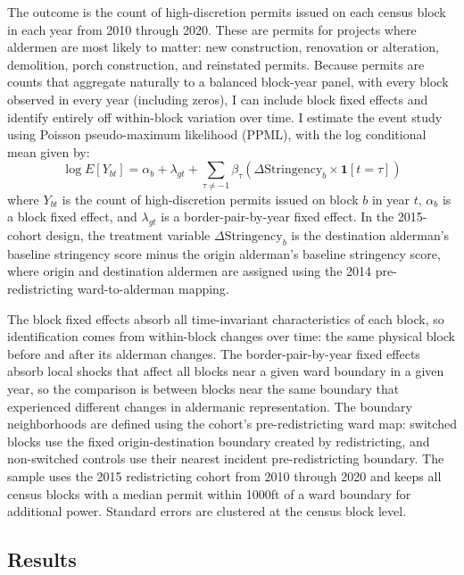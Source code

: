 The outcome is the count of high-discretion permits issued on each census block in each year from 2010 through 2020.
These are permits for projects where aldermen are most likely to matter: new construction, renovation or alteration, demolition, porch construction, and reinstated permits.
Because permits are counts that aggregate naturally to a balanced block-year panel, with every block observed in every year (including zeros), I can include block fixed effects and identify entirely off within-block variation over time.
I estimate the event study using Poisson pseudo-maximum likelihood (PPML), with the log conditional mean given by:
%
\begin{equation}
\label{eq:event_study_permits}
\log E[Y_{bt}] = \alpha_b + \lambda_{gt} + \sum_{\tau \neq -1} \beta_\tau \left( \Delta\text{Stringency}_b \times \mathbf{1}[t = \tau] \right)
\end{equation}
%
where $Y_{bt}$ is the count of high-discretion permits issued on block $b$ in year $t$, $\alpha_b$ is a block fixed effect, and $\lambda_{gt}$ is a border-pair-by-year fixed effect.
In the 2015-cohort design, the treatment variable $\Delta\text{Stringency}_b$ is the destination alderman's baseline stringency score minus the origin alderman's baseline stringency score, where origin and destination aldermen are assigned using the 2014 pre-redistricting ward-to-alderman mapping.

The block fixed effects absorb all time-invariant characteristics of each block, so identification comes from within-block changes over time: the same physical block before and after its alderman changes.
The border-pair-by-year fixed effects absorb local shocks that affect all blocks near a given ward boundary in a given year, so the comparison is between blocks near the same boundary that experienced different changes in aldermanic representation.
The boundary neighborhoods are defined using the cohort's pre-redistricting ward map: switched blocks use the fixed origin-destination boundary created by redistricting, and non-switched controls use their nearest incident pre-redistricting boundary.
The sample uses the 2015 redistricting cohort from 2010 through 2020 and keeps all census blocks with a median permit within 1000ft of a ward boundary for additional power.
Standard errors are clustered at the census block level.

\subsection{Results}

